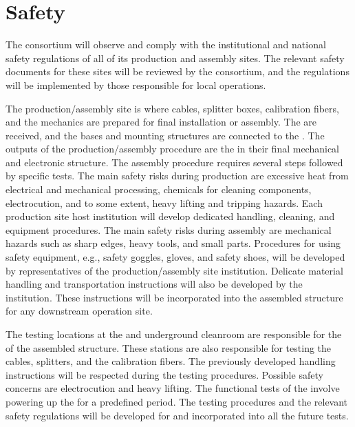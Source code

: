\section{Safety}
\label{sec:dp-pds-safety}

The   consortium will observe and comply with the institutional and national safety regulations of all of its production and assembly sites. The relevant safety documents for these sites will be reviewed by the consortium, and the regulations will be implemented by those responsible for local operations.

The production/assembly site is where  cables,  splitter boxes, calibration fibers, and the  mechanics are prepared for final installation or assembly. The  are received, and the bases and mounting structures are connected to the . The outputs of the production/assembly procedure are the  in their final mechanical and electronic structure. The assembly procedure requires several steps followed by specific  tests. The main safety risks during production are excessive heat from electrical and mechanical processing, chemicals for cleaning components, electrocution, and to some extent, heavy lifting and tripping hazards. Each production site host institution will develop dedicated handling, cleaning, and equipment procedures. The main safety risks during assembly are mechanical hazards such as sharp edges, heavy tools, and small parts. Procedures for using safety equipment, e.g.,  safety goggles, gloves, and safety shoes, will be developed by representatives of the production/assembly site institution. Delicate material handling and transportation instructions will also be developed by the institution. These instructions will be incorporated into the assembled structure for any downstream operation site.

The testing locations at the  and underground cleanroom  are responsible for the  of the assembled  structure. These stations are also responsible for testing the  cables,  splitters, and the calibration fibers. The previously developed handling instructions will be respected during the testing procedures. Possible safety concerns are electrocution and heavy lifting. The functional tests of the  involve powering up the  for a predefined period. The testing procedures and the relevant safety regulations will be developed for and incorporated into all the future  tests.

